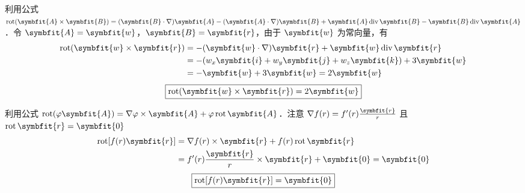 \begin{solution}

    利用公式 $\operatorname{rot} (\symbfit{A} \times \symbfit{B}) = (\symbfit{B} \cdot \nabla) \symbfit{A} - (\symbfit{A} \cdot \nabla) \symbfit{B} + \symbfit{A} \operatorname{div} \symbfit{B} - \symbfit{B} \operatorname{div} \symbfit{A}$．令 $\symbfit{A} = \symbfit{w}$，$\symbfit{B} = \symbfit{r}$，由于 $\symbfit{w}$ 为常向量，有
    \begin{equation}
        \begin{aligned}
            \operatorname{rot} (\symbfit{w} \times \symbfit{r}) & = -(\symbfit{w} \cdot \nabla) \symbfit{r} + \symbfit{w} \operatorname{div} \symbfit{r} \\
                                                                & = -(w_x \symbfit{i} + w_y \symbfit{j} + w_z \symbfit{k}) + 3\symbfit{w}                \\
                                                                & = -\symbfit{w} + 3\symbfit{w} = 2\symbfit{w}
        \end{aligned}
    \end{equation}
    \begin{equation}
        \boxed{\operatorname{rot} (\symbfit{w} \times \symbfit{r}) = 2\symbfit{w}}
    \end{equation}


    利用公式 $\operatorname{rot} (\varphi \symbfit{A}) = \nabla \varphi \times \symbfit{A} + \varphi \operatorname{rot} \symbfit{A}$．注意 $\nabla f(r) = f'(r) \frac{\symbfit{r}}{r}$ 且 $\operatorname{rot} \symbfit{r} = \symbfit{0}$
    \begin{equation}
        \begin{aligned}
            \operatorname{rot} [f(r) \symbfit{r}] & = \nabla f(r) \times \symbfit{r} + f(r) \operatorname{rot} \symbfit{r}       \\
                                                  & = f'(r) \frac{\symbfit{r}}{r} \times \symbfit{r} + \symbfit{0} = \symbfit{0}
        \end{aligned}
    \end{equation}
    \begin{equation}
        \boxed{\operatorname{rot} [f(r) \symbfit{r}] = \symbfit{0}}
    \end{equation}



\end{solution}
